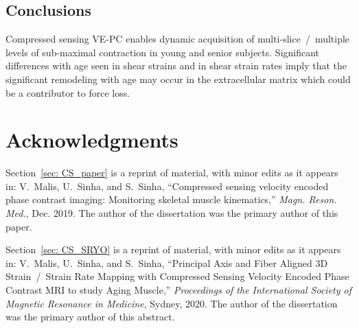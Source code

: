 \subsection{Conclusions}
Compressed sensing VE-PC enables dynamic acquisition of multi-slice~/~multiple levels of sub-maximal contraction in young and senior subjects. 
Significant differences with age seen in shear strains and in shear strain rates imply that the significant remodeling with age may occur in the extracellular matrix which could be a contributor to force loss. 
\section{Acknowledgments}
Section~\ref{sec: CS_paper} is a reprint of material, with minor edits as it appears in: V.~Malis, U.~Sinha, and S.~Sinha, ``Compressed sensing velocity encoded phase contrast imaging: Monitoring skeletal muscle kinematics,'' \emph{Magn. Reson. Med.}, Dec. 2019.
The author of the dissertation was the primary author of this paper.

Section~\ref{sec: CS_SRYO} is a reprint of material, with minor edits as it appears in: V.~Malis, U.~Sinha, and S.~Sinha, ``Principal Axis and Fiber Aligned 3D Strain~/~Strain Rate Mapping with Compressed Sensing Velocity Encoded Phase Contrast MRI to study Aging Muscle,'' \emph{Proceedings of the International Society of Magnetic Resonance in Medicine}, Sydney, 2020.
The author of the dissertation was the primary author of this abstract.
